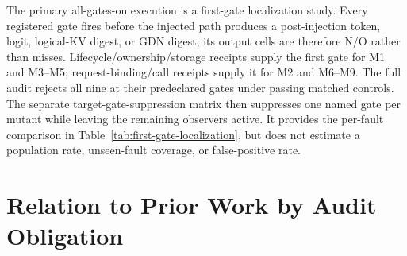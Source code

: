 \documentclass{article}
\begin{document}
The primary all-gates-on execution is a first-gate localization study.  Every registered gate
fires before the injected path produces a post-injection token, logit,
logical-KV digest, or GDN digest; its output cells are therefore N/O rather
than misses.
Lifecycle/ownership/storage receipts supply the first gate for M1 and M3--M5;
request-binding/call receipts supply it for M2 and M6--M9.  The full audit
rejects all nine at their predeclared gates under passing matched controls.
The separate target-gate-suppression matrix then suppresses one named gate per mutant while leaving
the remaining observers active.  It provides the per-fault comparison in
Table~\ref{tab:first-gate-localization}, but does not estimate a population
rate, unseen-fault coverage, or false-positive rate.

\section{Relation to Prior Work by Audit Obligation}
\label{app:novelty-boundary}
\end{document}
